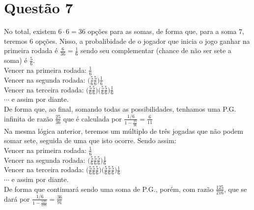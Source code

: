 \documentclass{article}
\begin{document}
\section*{Questão 7}
No total, existem $6 \cdot 6 = 36$ opções para as somas, de forma que, para a soma $7$, teremos $6$ opções. Nisso, a probalibidade de o jogador que inicia o jogo ganhar na primeira rodada é $\frac{6}{36} = \frac{1}{6}$ sendo seu complementar (chance de não ser sete a soma) é $\frac{5}{6}$.
\vspace{\baselineskip}\\
Vencer na primeira rodada: $\frac{1}{6}$
\vspace{\baselineskip}\\
Vencer na segunda rodada: $\biggl(\frac{5}{6} \frac{5}{6}\biggr) \frac{1}{6}$
\vspace{\baselineskip}\\
Vencer na terceira rodada: $\biggl(\frac{5}{6} \frac{5}{6}\biggr) \biggl(\frac{5}{6} \frac{5}{6}\biggr) \frac{1}{6}$
\vspace{\baselineskip}\\
$\cdots$ e assim por diante.
\vspace{\baselineskip}\\
De forma que, ao final, somando todas as possibilidades, tenhamos uma P.G. infinita de razão $\frac{25}{36}$ que é calculada por $\frac{1/6}{1 - \frac{25}{36}} = \frac{6}{11}$
\vspace{\baselineskip}\\
Na mesma lógica anterior, teremos um múltiplo de três jogadas que não podem somar sete, seguida de uma que isto ocorre. Sendo assim:
\vspace{\baselineskip}\\
Vencer na primeira rodada: $\frac{1}{6}$
\vspace{\baselineskip}\\
Vencer na segunda rodada: $\biggl(\frac{5}{6} \frac{5}{6} \frac{5}{6}\biggr) \frac{1}{6}$
\vspace{\baselineskip}\\
Vencer na terceira rodada: $\biggl(\frac{5}{6} \frac{5}{6} \frac{5}{6}\biggr) \biggl(\frac{5}{6} \frac{5}{6} \frac{5}{6}\biggr) \frac{1}{6}$
\vspace{\baselineskip}\\
$\cdots$ e assim por diante.
\vspace{\baselineskip}\\
De forma que continuará sendo uma soma de P.G., porém, com razão $\frac{125}{216}$, que se dará por $\frac{1/6}{1 - \frac{125}{216}} = \frac{36}{91}$
\end{document}
